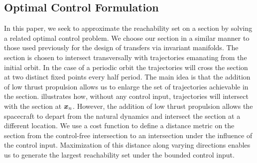 \documentclass[smallcondensed]{svjour3}
\begin{document}
\subsection{Optimal Control Formulation}\label{sec:optimal_control}
In this paper, we seek to approximate the reachability set on a \Poincare section by solving a related optimal control problem. 
We choose our \Poincare section in a similar manner to those used previously for the design of transfers via invariant manifolds.
The \Poincare section is chosen to intersect transversally with trajectories emanating from the initial orbit. 
In the case of a periodic orbit the trajectories will cross the \Poincare section at two distinct fixed points every half period.
The main idea is that the addition of low thrust propulsion allows us to enlarge the set of trajectories achievable in the \Poincare section. 
 illustrates how, without any control input, trajectories will intersect with the \Poincare section at \( \bm{x}_n \). 
However, the addition of low thrust propulsion allows the spacecraft to depart from the natural dynamics and intersect the \Poincare section at a different location.
We use a cost function to define a distance metric on the \Poincare section from the control-free intersection to an intersection under the influence of the control input.
Maximization of this distance along varying directions enables us to generate the largest reachability set under the bounded control input.
\end{document}
